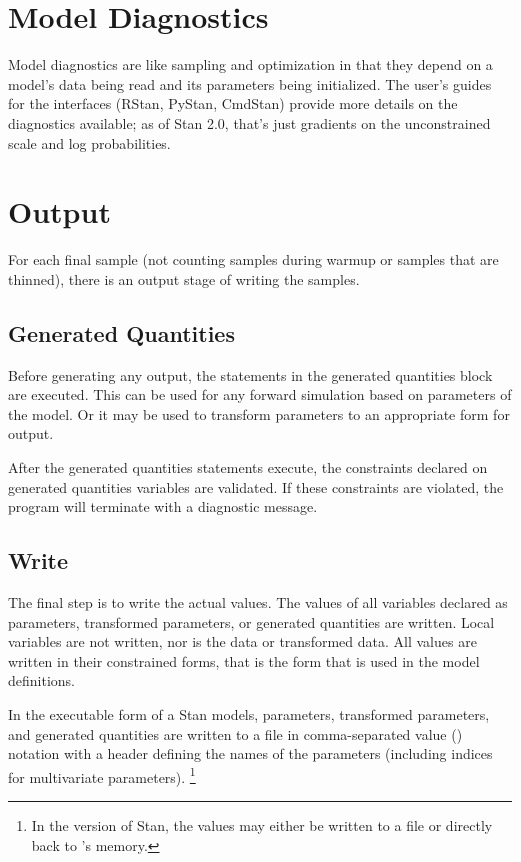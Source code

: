 \section{Model Diagnostics}

Model diagnostics are like sampling and optimization in that they
depend on a model's data being read and its parameters being
initialized.  The user's guides for the interfaces (RStan, PyStan,
CmdStan) provide more details on the diagnostics available; as of Stan
2.0, that's just gradients on the unconstrained scale and log
probabilities.

\section{Output}

For each final sample (not counting samples during warmup or samples
that are thinned), there is an output stage of writing the samples.

\subsection{Generated Quantities}

Before generating any output, the statements in the generated quantities
block are executed.  This can be used for any forward simulation based
on parameters of the model.  Or it may be used to transform parameters
to an appropriate form for output.

After the generated quantities statements execute, the constraints
declared on generated quantities variables are validated.   If these
constraints are violated, the program will terminate with a diagnostic message.

\subsection{Write}

The final step is to write the actual values.  The values of all
variables declared as parameters, transformed parameters, or generated
quantities are written.  Local variables are not written, nor is the
data or transformed data.  All values are written in their constrained
forms, that is the form that is used in the model definitions.

In the executable form of a Stan models, parameters, transformed
parameters, and generated quantities are written to a file in
comma-separated value () notation with a header defining
the names of the parameters (including indices for multivariate
parameters).%
\footnote{In the \R version of Stan, the values may either be
written to a  file or directly back to \R's memory.}

